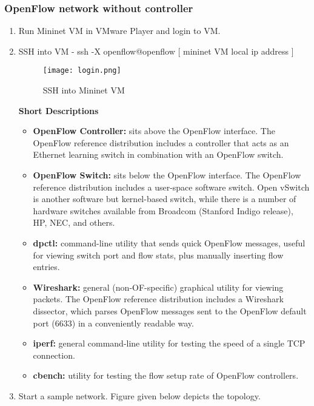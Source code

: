 \documentclass[12pt,a4paper]{article}
\begin{document}
\subsubsection{OpenFlow network without controller}
\begin{enumerate}
\item Run Mininet VM in VMware Player and login to VM.

\item SSH into VM - ssh -X openflow@openflow [ mininet VM local ip address ] 

\begin{figure}[H]
\begin{center}

\texttt{[image: login.png]}
\end{center}
\caption{SSH into Mininet VM}
\end{figure}

\textbf{Short Descriptions}
\begin{itemize}

\item \textbf{OpenFlow Controller:} sits above the OpenFlow interface. The OpenFlow reference distribution includes a controller that acts as an Ethernet learning switch in combination with an OpenFlow switch.
\item  \textbf{ OpenFlow Switch:} sits below the OpenFlow interface. The OpenFlow reference distribution includes a user-space software switch. Open vSwitch is another software but kernel-based switch, while there is a number of hardware switches available from Broadcom (Stanford Indigo release), HP, NEC, and others.
\item \textbf{ dpctl:} command-line utility that sends quick OpenFlow messages, useful for viewing switch port and flow stats, plus manually inserting flow entries.
\item \textbf{ Wireshark:} general (non-OF-specific) graphical utility for viewing packets. The OpenFlow reference distribution includes a Wireshark dissector, which parses OpenFlow messages sent to the OpenFlow default port (6633) in a conveniently readable way.
\item \textbf{ iperf:} general command-line utility for testing the speed of a single TCP connection.
\item \textbf{ cbench: } utility for testing the flow setup rate of OpenFlow controllers.
\end{itemize}

\item Start a sample network. Figure given below depicts the topology.
\begin{figure}[H]
\begin{center}


\end{center}
\end{figure}
\end{enumerate}
\end{document}
